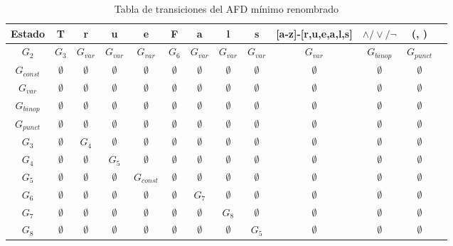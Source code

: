 \begin{table}[h!]
    \centering
    \begin{tabular}{|c|c|c|c|c|c|c|c|c|c|c|c|c|}
    \hline
    Estado &T & r & u & e & F & a & l &s &[a-z]-[r,u,e,a,l,s] &$\land/\lor/\lnot$ & (, )\\ \hline
    \hline
    $G_2$ & $ G_3$ & $ G_{var}$ & $G_{var}$ & $G_{var}$ & $G_6$ & $G_{var}$ & $G_{var}$ & $G_{var}$ & $G_{var}$ & $G_{binop}$ & $G_{punct}$\\ \hline
    $G_{const}$ & $\emptyset$ & $\emptyset$ & $\emptyset$ & $\emptyset$ & $\emptyset$ & $\emptyset$ & $\emptyset$ & $\emptyset $ & $\emptyset$ & $\emptyset$ & $\emptyset$\\ \hline
    $G_{var}$ & $\emptyset$ & $\emptyset$ & $\emptyset$ & $\emptyset$ & $\emptyset$ & $\emptyset$ & $\emptyset$ & $\emptyset $ & $\emptyset$ & $\emptyset$ & $\emptyset$\\ \hline
    $G_{binop}$ & $\emptyset$ & $\emptyset$ & $\emptyset$ & $\emptyset$ & $\emptyset$ & $\emptyset$ & $\emptyset$ & $\emptyset $ & $\emptyset$ & $\emptyset$ & $\emptyset$\\ \hline
    $G_{punct}$ & $\emptyset$ & $\emptyset$ & $\emptyset$ & $\emptyset$ & $\emptyset$ & $\emptyset$ & $\emptyset$ & $\emptyset $ & $\emptyset$ & $\emptyset$ & $\emptyset$\\ \hline
    $G_3$ & $\emptyset$ &  $G_4$& $\emptyset$ & $\emptyset$ & $\emptyset$  & $\emptyset$ & $\emptyset$ & $\emptyset$ & $\emptyset$ & $\emptyset$ & $\emptyset$\\ \hline
    $G_4$ & $\emptyset$ &  $\emptyset$&  $G_5$& $\emptyset$ & $\emptyset$  & $\emptyset$ & $\emptyset$ & $\emptyset$ & $\emptyset$ & $\emptyset$ & $\emptyset$\\ \hline
    $G_5$ & $\emptyset$ &  $\emptyset$& $\emptyset$ &  $G_{const}$& $\emptyset$  & $\emptyset$ & $\emptyset$ & $\emptyset$ & $\emptyset$ & $\emptyset$ & $\emptyset$\\ \hline
    $G_6$ & $\emptyset$ & $\emptyset$ & $\emptyset$ & $\emptyset$  & $\emptyset$  & $G_7$ & $\emptyset$ & $\emptyset$& $\emptyset$ & $\emptyset$ & $\emptyset$\\ \hline
    $G_7$ & $\emptyset$ &  $\emptyset$& $\emptyset$ & $\emptyset$ & $\emptyset$  & $\emptyset$ & $G_8$ & $\emptyset$ & $\emptyset$ & $\emptyset$ & $\emptyset$\\ \hline
    $G_8$ & $\emptyset$ &  $\emptyset$& $\emptyset$ & $\emptyset$ & $\emptyset$  & $\emptyset$ & $\emptyset$ & $G_5$ & $\emptyset$ & $\emptyset$ & $\emptyset$\\ \hline
    \end{tabular}
    \caption{Tabla de transiciones del AFD mínimo renombrado}
\end{table}

